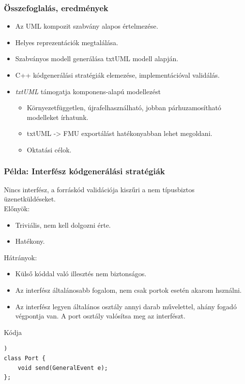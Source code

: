 \documentclass[11pt]{beamer}
\begin{document}
\begin{frame}
	\frametitle{Összefoglalás, eredmények}
	\begin{itemize}
	\item Az UML kompozit szabvány alapos értelmezése.
	\item Helyes reprezentációk megtalálása.
	\item Szabványos modell generálása txtUML modell alapján.
	\item C++ kódgenerálási stratégiák elemezése, implementációval validálás.
	\item \textit{txtUML} támogatja komponens-alapú modellezést
	\begin{itemize}
	\item Környezetfüggetlen, újrafelhasználható, jobban párhuzamosítható modelleket írhatunk.
	\item {txtUML} -> {FMU} exportálást hatékonyabban lehet megoldani.
	\item Oktatási célok.
	\end{itemize}
	\end{itemize}
\end{frame}

\begin{frame}[fragile]
	\frametitle{Példa: Interfész kódgenerálási stratégiák}
	Nincs interfész, a forráskód validációja kiszűri a nem típusbiztos üzenetküldéseket. \\
	Előnyök:
	\begin{itemize}
		\item Triviális, nem kell dolgozni érte.
		\item Hatékony.
	\end{itemize}
	Hátrányok:
	\begin{itemize}
		\item Külső kóddal való illesztés nem biztonságos.
		\item Az interfész általánosabb fogalom, nem csak portok esetén akarom hsználni.
		\item 	Az interfész legyen általános osztály annyi darab művelettel, ahány fogadó végpontja van. A port osztály valósítsa meg az interfészt.
	\end{itemize}
	
		\begin{block}{Kódja}
	\begin{lstlisting}[basicstyle=\small])
class Port {
	void send(GeneralEvent e);
};
	\end{lstlisting}
	\end{block}
\end{frame}
\end{document}
